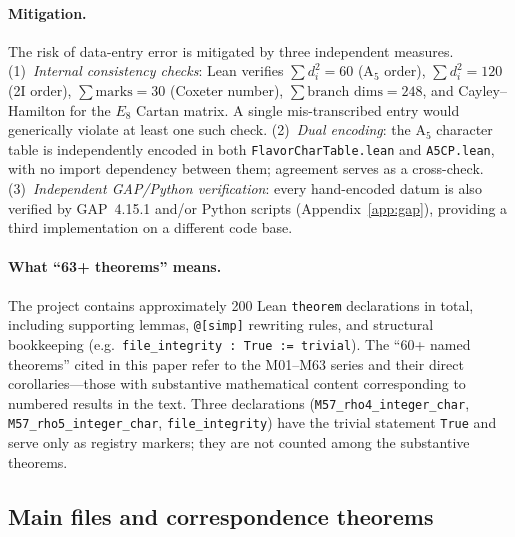 \documentclass[sn-mathphys-num,Numbered]{sn-jnl}
\theoremstyle{thmstyleone}
\theoremstyle{thmstylethree}
\begin{document}
\begin{appendices}
\paragraph{Mitigation.}
The risk of data-entry error is mitigated by three independent measures.
(1)~\emph{Internal consistency checks}: Lean verifies $\sum d_i^2 = 60$
(A$_5$ order), $\sum d_i^2 = 120$ (2I order), $\sum\text{marks} = 30$
(Coxeter number), $\sum\text{branch dims} = 248$, and Cayley--Hamilton for
the $E_8$ Cartan matrix.  A single mis-transcribed entry would generically
violate at least one such check.
(2)~\emph{Dual encoding}: the A$_5$ character table is independently encoded
in both \texttt{FlavorCharTable.lean} and \texttt{A5CP.lean}, with no import
dependency between them; agreement serves as a cross-check.
(3)~\emph{Independent GAP/Python verification}: every hand-encoded datum is
also verified by GAP~4.15.1 and/or Python scripts (Appendix~\ref{app:gap}),
providing a third implementation on a different code base.

\paragraph{What ``63+ theorems'' means.}
The project contains approximately 200 Lean \texttt{theorem} declarations in
total, including supporting lemmas, \texttt{@[simp]} rewriting rules, and
structural bookkeeping (e.g.\ \texttt{file\_integrity :\ True := trivial}).
The ``60+ named theorems'' cited in this paper refer to the M01--M63
series and their direct corollaries---those with substantive mathematical
content corresponding to numbered results in the text.  Three declarations
(\texttt{M57\_rho4\_integer\_char}, \texttt{M57\_rho5\_integer\_char},
\texttt{file\_integrity}) have the trivial statement \texttt{True} and serve
only as registry markers; they are not counted among the substantive
theorems.


\subsection{Main files and correspondence theorems}


\end{appendices}
\end{document}

